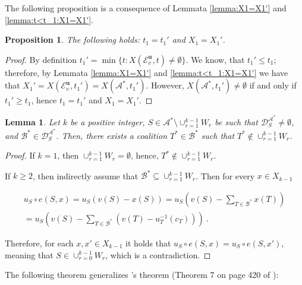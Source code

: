 \documentclass[a4paper,12pt]{article}
\newtheorem{lemma}[theorem]{Lemma}
\newtheorem{proposition}[theorem]{Proposition}
\theoremstyle{definition}
\theoremstyle{remark}
\begin{document}
The following proposition is a consequence of Lemmata \ref{lemma:X1=X1'} and \ref{lemma:t<t_1:X1=X1'}.

\begin{proposition}\label{prop:X1=Y1}
The following holds: $t_1 = t_1'$ and $X_1 = X_1'$.
\end{proposition}

\begin{proof}
By definition $t_1' = \min \{ t\colon X(\mathcal{E}_v^{\mathbf{u}}, t) \neq \emptyset \}$. We know, that $t_1'\leq t_1$; therefore, by Lemmata \ref{lemma:X1=X1'} and \ref{lemma:t<t_1:X1=X1'} we have that $X_1' = X(\mathcal{E}_v^{\mathbf{u}}, t_1') =  X(\mathcal{A}^\ast, t_1')$. However,  $X(\mathcal{A}^\ast, t_1') \neq \emptyset$ if and only if $t_1'\geq t_1$, hence $t_1 = t_1'$ and $X_1 = X_1'$.
\end{proof}

\begin{lemma}\label{lemma:rest2}
Let $k$ be a positive integer, $S \in \mathcal{A}^\ast  \setminus \cup_{r=1}^{k-1} W_r$ be such that $\mathcal{D}_S^{\mathcal{A}^{\ast}} \neq \emptyset$, and $\mathcal{B}^\ast \in \mathcal{D}_S^{\mathcal{A}^{\ast}}$. Then, there exists a coalition $T^\ast \in \mathcal{B}^\ast$ such that $T^\ast \notin \cup_{r=1}^{k-1} W_r$.
\end{lemma}

\begin{proof}
If $k = 1$, then $ \cup_{r=1}^{k-1} W_r = \emptyset$, hence, $T^\ast \notin \cup_{r=1}^{k-1} W_r$. 

\noindent If $k \geq 2$, then indirectly assume that $\mathcal{B}^\ast \subseteq \cup_{r=1}^{k-1}W_r$. Then for every $x \in X_{k-1}$

\begin{equation*}
\begin{split}
u_S \circ e(S, x) = u_S(v(S) - x(S)) = u_S \left( v(S) -  \sum_{T \in \mathcal{B}^\ast} x (T) \right) \\
= u_S \left( v(S) - \sum \limits_{T \in \mathcal{B}^\ast} (v(T) - u_T^{-1}(c_T)) \right) \ .
\end{split}
\end{equation*}

\noindent Therefore, for each $x,x' \in X_{k-1}$ it holds that $u_S \circ e(S,x) = u_S \circ e(S,x')$, meaning that $S \in \cup_{r=0}^{k-1}W_r$, which is a contradiction.
\end{proof}

The following theorem generalizes   \citet{Huberman1980}'s theorem (Theorem 7 on page 420 of \cite{Huberman1980}):
\end{document}
